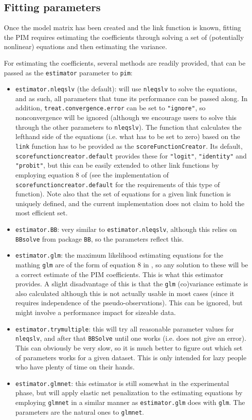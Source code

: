 \documentclass[12pt]{article}
\newcommand{\pim}[1]{\texttt{#1}}%
\newcommand{\cd}[1]{\texttt{#1}}%
\begin{document}
\subsection{Fitting parameters}\label{SS_fit}
Once the model matrix has been created and the link function is known, fitting the PIM requires estimating the coefficients through solving a set of (potentially nonlinear) equations and then estimating the variance.

For estimating the coefficients, several methods are readily provided, that can be passed as the \cd{estimator} parameter to \pim{pim}:
\begin{itemize}
	\item \pim{estimator.nleqslv} (the default): will use \cd{nleqslv} to solve the equations, and as such, all parameters that tune its performance can be passed along. In addition, \cd{treat.convergence.error} can be set to \cd{"ignore"}, so nonconvergence will be ignored (although we encourage users to solve this through the other parameters to \cd{nleqslv}). The function that calculates the lefthand side of the equations (i.e. what has to be set to zero) based on the \cd{link} function has to be provided as the \cd{scoreFunctionCreator}. Its default, \pim{scorefunctioncreator.default} provides these for \cd{"logit"}, \cd{"identity"} and \cd{"probit"}, but this can be easily extended to other link functions by employing equation 8 of \cite{Thas2012} (see the implementation of \cd{scorefunctioncreator.default} for the requirements of this type of function). Note also that the set of equations for a given link function is uniquely defined, and the current implementation does not claim to hold the most efficient set.
	\item \pim{estimator.BB}: very similar to \cd{estimator.nleqslv}, although this relies on \cd{BBsolve} from package \cd{BB}, so the parameters reflect this.
	\item \pim{estimator.glm}: the maximum likelihood estimating equations for the mathing \cd{glm} are of the form of equation 8 in \cite{Thas2012}, so any solution to these will be a correct estimate of the PIM coefficients. This is what this estimator provides. A slight disadvantage of this is that the \cd{glm} (co)variance estimate is also calculated although this is not actually usable in most cases (since it requires independence of the pseudo-observations). This can be ignored, but might involve a performance impact for sizeable data.
	\item \pim{estimator.trymultiple}: this will try all reasonable parameter values for \cd{nleqslv}, and after that \cd{BBSolve} until one works (i.e. does not give an error). This can obviously be very slow, so it is much better to figure out which set of parameters works for a given dataset. This is only intended for lazy people who have plenty of time on their hands.
	\item \pim{estimator.glmnet}: this estimator is still somewhat in the experimental phase, but will apply elastic net penalization to the estimating equations by employing \cd{glmnet} in a similar manner as \pim{estimator.glm} does with \cd{glm}. The parameters are the natural ones to \cd{glmnet}.
\end{itemize}
\end{document}
